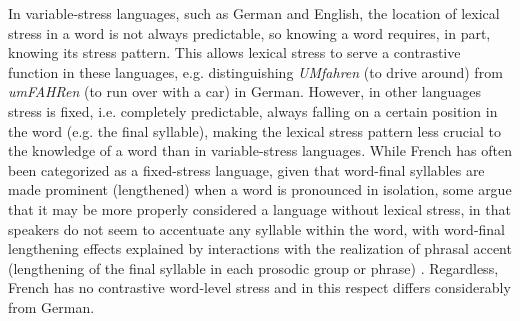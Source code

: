 \documentclass[a4paper]{article}
\begin{document}
In variable-stress languages, such as German and English, 
the location of lexical stress in a word is not always predictable,
so knowing a word requires, in part, knowing its stress pattern. This allows lexical stress to serve a contrastive function in these languages, 
e.g. distinguishing \textit{UMfahren} (to drive around) from \textit{umFAHRen} (to run over with a car) in German. 
%
However, in other languages stress is fixed, i.e. completely predictable, always falling on a certain position in the word (e.g. the final syllable), making the lexical stress pattern less crucial to the knowledge of a word than in variable-stress languages. 
While French has often been categorized as a fixed-stress language, given that word-final syllables are made prominent (lengthened) when a word is pronounced in isolation, some argue that it may be more properly considered a language without lexical stress, in that speakers do not seem to accentuate any syllable within the word, with word-final lengthening effects explained by interactions with the realization of phrasal accent (lengthening of the final syllable in each prosodic group or phrase) \cite{Michaux2013}. %
Regardless, French has no contrastive word-level stress %
and in this respect differs considerably from German.
\end{document}
